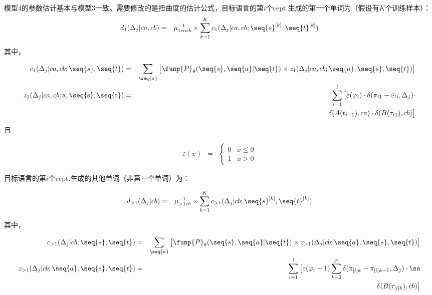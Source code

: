 \begin{appendices}
\parinterval 模型4的参数估计基本与模型3一致。需要修改的是扭曲度的估计公式，目标语言的第$i$个cept.生成的第一个单词为（假设有$K$个训练样本）：
\begin{eqnarray}
d_1(\Delta_j|ca,cb) &=& \mu_{1cacb}^{-1} \times \sum_{k=1}^{K}c_1(\Delta_j|ca,cb;\seq{s}^{[k]},\seq{t}^{[k]})
\label{eq:1.15}
\end{eqnarray}

\noindent 其中，

\begin{eqnarray}
c_1(\Delta_j|ca,cb;\seq{s},\seq{t})           & = & \sum_{\seq{a}}\big[\funp{P}_{\theta}(\seq{s},\seq{a}|\seq{t}) \times z_1(\Delta_j|ca,cb;\seq{a},\seq{s},\seq{t})\big] \label{eq:1.16} \\
z_1(\Delta_j|ca,cb;\rm{a},\seq{s},\seq{t}) & = & \sum_{i=1}^l \big[\varepsilon(\varphi_i) \cdot \delta(\pi_{i1}-\odot _{i},\Delta_j) \cdot \nonumber \\
                                                                           &     & \delta(A(t_{i-1}),ca) \cdot \delta(B(\tau_{i1}),cb) \big] \label{eq:1.17}
\end{eqnarray}

\noindent 且

\begin{eqnarray}
\varepsilon(x) &=& \begin{cases}
0 & x \leq 0 \\
1 & x > 0
\end{cases}
\label{eq:1.21}
\end{eqnarray}

\noindent 目标语言的第$i$个cept.生成的其他单词（非第一个单词）为：

\begin{eqnarray}
d_{>1}(\Delta_j|cb) &=& \mu_{>1cb}^{-1} \times \sum_{k=1}^{K}c_{>1}(\Delta_j|cb;\seq{s}^{[k]},\seq{t}^{[k]})
\label{eq:1.18}
\end{eqnarray}

\noindent 其中，

\begin{eqnarray}
c_{>1}(\Delta_j|cb;\seq{s},\seq{t})                  & = & \sum_{\seq{a}}\big[\funp{P}_{\theta}(\seq{s},\seq{a}|\seq{t}) \times z_{>1}(\Delta_j|cb;\seq{a},\seq{s},\seq{t}) \big] \label{eq:1.19} \\
z_{>1}(\Delta_j|cb;\seq{a},\seq{s},\seq{t}) & = & \sum_{i=1}^l \big[\varepsilon(\varphi_i-1)\sum_{k=2}^{\varphi_i}\delta(\pi_{[i]k}-\pi_{[i]k-1},\Delta_j) \cdot \nonumber ß\\
                                                                                  &    & \delta(B(\tau_{[i]k}),cb) \big] \label{eq:1.20}
\end{eqnarray}


\end{appendices}
